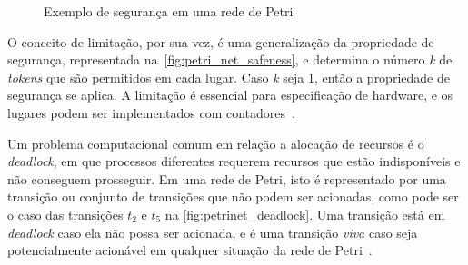\begin{figure}[ht]
    \centering
    \caption{Exemplo de segurança em uma rede de Petri}
    \label{fig:petri_net_safeness}
        \hspace{0.1cm}
\end{figure}

O conceito de limitação, por sua vez, é uma generalização da propriedade de segurança, representada na~\autoref{fig:petri_net_safeness}, e determina o número \textit{k} de \textit{tokens} que são permitidos em cada lugar. Caso \textit{k} seja 1, então a propriedade de segurança se aplica. A limitação é essencial para especificação de hardware, e os lugares podem ser implementados com contadores~\cite{peterson:1981}.

Um problema computacional comum em relação a alocação de recursos é o \textit{deadlock}, em que processos diferentes requerem recursos que estão indisponíveis e não conseguem prosseguir. Em uma rede de Petri, isto é representado por uma transição ou conjunto de transições que não podem ser acionadas, como pode ser o caso das transições $t_2$ e $t_5$ na \autoref{fig:petrinet_deadlock}. Uma transição está em \textit{deadlock} caso ela não possa ser acionada, e é uma transição \textit{viva} caso seja potencialmente acionável em qualquer situação da rede de Petri~\cite{peterson:1981}.

